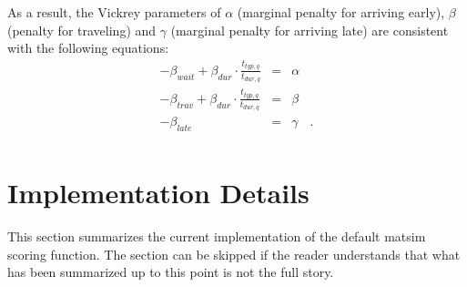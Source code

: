 As a result, the Vickrey parameters of $\alpha$ (marginal penalty for arriving early), $\beta$ (penalty for traveling) and $\gamma$ (marginal penalty for arriving late) \citep[as defined by][]{ArnottEtcBottleneck-inelastic} are consistent with the following equations:
\begin{equation}
\begin{array}{ccrc}
-\beta_{wait} + \beta_{dur} \cdot \frac{t_{typ,q}}{t_{dur,q}} & = & \alpha & \\
-\beta_{trav} + \beta_{dur} \cdot \frac{t_{typ,q}}{t_{dur,q}} & = & \beta & \\
- \beta_{late} & = & \gamma & . \\
\end{array}
\end{equation}


\section{Implementation Details}
\label{sec:scoring-current}
This section summarizes the current implementation of the default \gls{matsim} scoring function. The section can be skipped if the reader understands that what has been summarized up to this point is not the full story.

%


